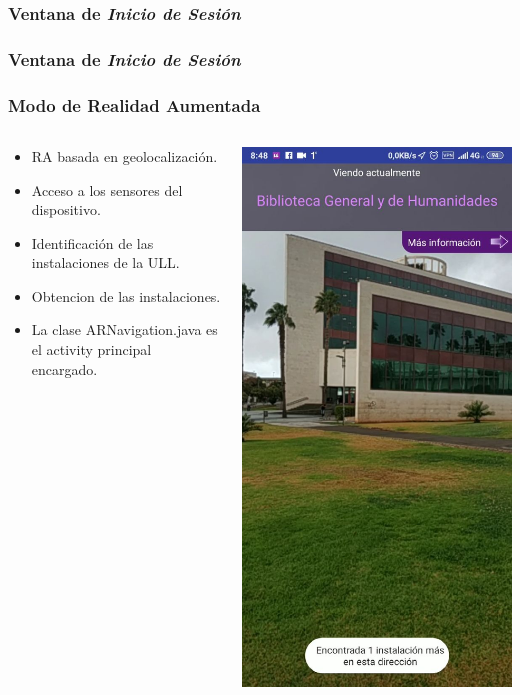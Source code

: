  
\begin{frame}
	\frametitle{Ventana de  \textit{Inicio de Sesión}}
	
\end{frame}


\begin{frame}
	\frametitle{Ventana de  \textit{Inicio de Sesión}}
	
\end{frame}

\begin{frame}
	\frametitle{Modo de Realidad Aumentada}
	\begin{columns}
		\begin{column}{0.6\textwidth}
			\begin{itemize}
				\item RA basada en geolocalización.
				\item Acceso a los sensores del dispositivo.
				\item Identificación de las instalaciones de la ULL.
				\item Obtencion de las instalaciones.
				\item La clase ARNavigation.java es el activity principal encargado.
			\end{itemize}
			\endblock{}
		\end{column}
		\begin{column}{0.4\textwidth} 
			\vfill 
			\begin{center}
				\includegraphics[width=0.7\linewidth]{Images/imagedera}

\end{center}
\end{column}
\end{columns}
\end{frame}
